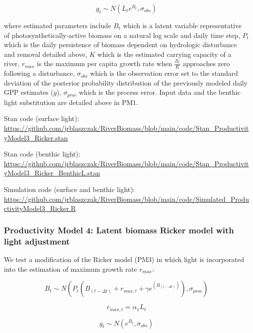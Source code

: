\documentclass[
]{article}
\begin{document}
\begin{equation}
    g_{t} \sim N(L_{t}e^{B_{t}},\sigma_{obs})
\end{equation}

where estimated parameters include \(B_{t}\) which is a latent variable
representative of photosynthetically-active biomass on a natural log
scale and daily time step, \(P_{t}\) which is the daily persistence of
biomass dependent on hydrologic disturbance and removal detailed above,
\(K\) which is the estimated carrying capacity of a river, \(r_{max}\)
is the maximum per capita growth rate when \(\frac {B_t}{K}\) approaches
zero following a disturbance, \(\sigma_{obs}\) which is the observation
error set to the standard deviation of the posterior probability
distribution of the previously modeled daily GPP estimates (\(g\)),
\(\sigma_{proc}\) which is the process error. Input data and the benthic
light substitution are detailed above in PM1.

Stan code (surface light):
\url{https://github.com/jrblaszczak/RiverBiomass/blob/main/code/Stan_ProductivityModel3_Ricker.stan}

Stan code (benthic light):
\url{https://github.com/jrblaszczak/RiverBiomass/blob/main/code/Stan_ProductivityModel3_Ricker_BenthicL.stan}

Simulation code (surface and benthic light):
\url{https://github.com/jrblaszczak/RiverBiomass/blob/main/code/Simulated_ProductivityModel3_Ricker.R}

\hypertarget{productivity-model-4-latent-biomass-ricker-model-with-light-adjustment}{%
\subsubsection{Productivity Model 4: Latent biomass Ricker model with
light
adjustment}\label{productivity-model-4-latent-biomass-ricker-model-with-light-adjustment}}

We test a modification of the Ricker model (PM3) in which light is
incorporated into the estimation of maximum growth rate \(r_{max}\):

\begin{equation}
    B_{t} \sim N(P_{t}(B_{(t-\Delta t)} + r_{max,t} + \gamma e^{(B_{(t-\Delta t)})}), \sigma_{proc})
\end{equation}

\begin{equation}
    r_{max,t} = \alpha_{1}L_{t}
\end{equation}

\begin{equation}
    g_{t} \sim N(e^{B_{t}},\sigma_{obs})
\end{equation}
\end{document}
